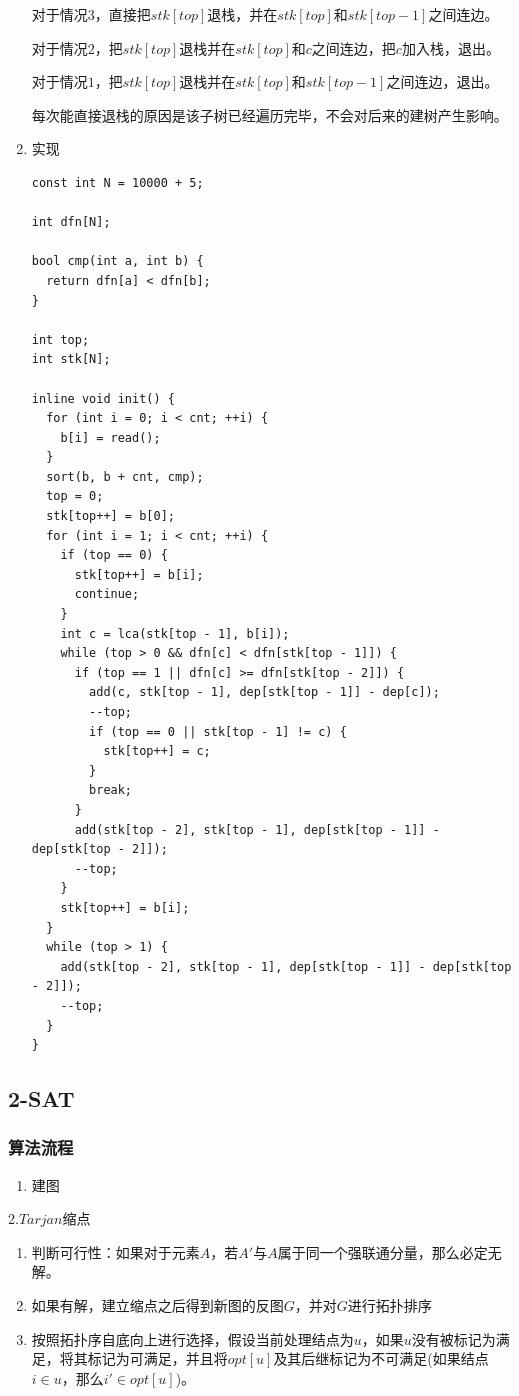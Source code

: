 \documentclass[11pt]{article}
\begin{document}
\begin{enumerate}
对于情况\(3\)，直接把\(stk[top]\)退栈，并在\(stk[top]\)和\(stk[top-1]\)之间连边。

对于情况\(2\)，把\(stk[top]\)退栈并在\(stk[top]\)和\(c\)之间连边，把\(c\)加入栈，退出。

对于情况\(1\)，把\(stk[top]\)退栈并在\(stk[top]\)和\(stk[top-1]\)之间连边，退出。

每次能直接退栈的原因是该子树已经遍历完毕，不会对后来的建树产生影响。

\item 实现
\label{sec-2-2-4-2}

\begin{verbatim}
const int N = 10000 + 5;

int dfn[N];

bool cmp(int a, int b) {
  return dfn[a] < dfn[b];
}

int top;
int stk[N];

inline void init() {
  for (int i = 0; i < cnt; ++i) {
    b[i] = read();
  }
  sort(b, b + cnt, cmp);
  top = 0;
  stk[top++] = b[0];
  for (int i = 1; i < cnt; ++i) {
    if (top == 0) {
      stk[top++] = b[i];
      continue;
    }
    int c = lca(stk[top - 1], b[i]);
    while (top > 0 && dfn[c] < dfn[stk[top - 1]]) {
      if (top == 1 || dfn[c] >= dfn[stk[top - 2]]) {
        add(c, stk[top - 1], dep[stk[top - 1]] - dep[c]);
        --top;
        if (top == 0 || stk[top - 1] != c) {
          stk[top++] = c;
        }
        break;
      }
      add(stk[top - 2], stk[top - 1], dep[stk[top - 1]] - dep[stk[top - 2]]);
      --top;
    }
    stk[top++] = b[i];
  }
  while (top > 1) {
    add(stk[top - 2], stk[top - 1], dep[stk[top - 1]] - dep[stk[top - 2]]);
    --top;
  }
}
\end{verbatim}
\end{enumerate}
\subsection{2-SAT}
\label{sec-2-3}
\subsubsection{算法流程}
\label{sec-2-3-1}

\begin{enumerate}
\item 建图
\end{enumerate}
2.\(Tarjan\)缩点
\begin{enumerate}
\item 判断可行性：如果对于元素\(A\)，若\(A'\)与\(A\)属于同一个强联通分量，那么必定无解。
\item 如果有解，建立缩点之后得到新图的反图\(G\)，并对\(G\)进行拓扑排序
\item 按照拓扑序自底向上进行选择，假设当前处理结点为\(u\)，如果\(u\)没有被标记为满足，将其标记为可满足，并且将\(opt[u]\)及其后继标记为不可满足(如果结点\(i \in u\)，那么\(i' \in opt[u]\))。
\end{enumerate}
\end{document}
